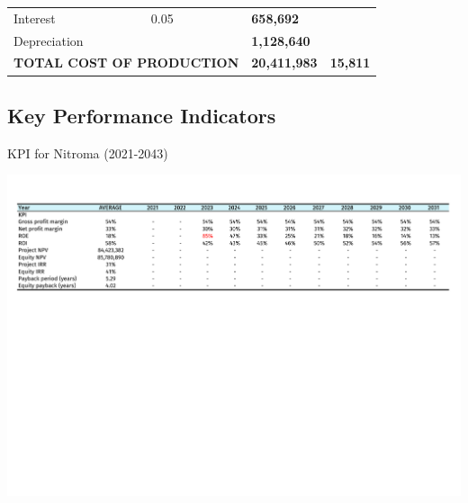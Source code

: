 \begin{table}[H]
\begin{tabular}{@{}llllll@{}}
Interest                      & 0.05                  &                                       &                           & \textbf{658,692}           &                      \\
Depreciation                  &                       &                                       &                           & \textbf{1,128,640}         &                      \\ \cline{5-6} 
\multicolumn{4}{l}{\textbf{TOTAL COST OF PRODUCTION}}                                                                     & \textbf{20,411,983}        & \textbf{15,811}     
\end{tabular}
\end{table}

\begin{landscape}
\subsection{Key Performance Indicators}
\begin{table}
\label{tab:KPI}
  \caption{KPI for Nitroma (2021-2043)}
\includegraphics[clip, trim=0cm 5cm 0cm 0cm, width=\linewidth]{chapters/Z-support/attachments/KPI1.pdf}
\end{table}


\end{landscape}
